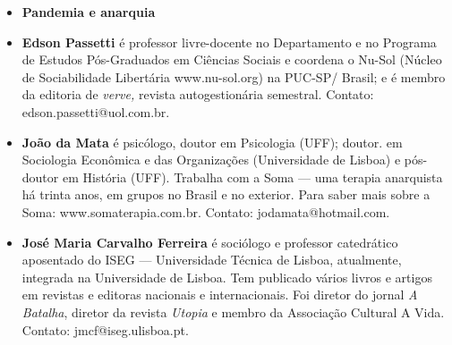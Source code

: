 \begin{itemize}
\item \textbf{Pandemia e anarquia} \lipsum[1]


\item \textbf{Edson Passetti} é professor livre-docente no Departamento e no
Programa de Estudos Pós-Graduados em Ciências Sociais e coordena o
Nu-Sol (Núcleo de Sociabilidade Libertária
www.nu-sol.org) na PUC-SP/ Brasil; e é membro da editoria de \emph{verve,} revista autogestionária semestral. Contato: edson.passetti@uol.com.br.

\item \textbf{João da Mata} é psicólogo, doutor em Psicologia (UFF); doutor.
em Sociologia Econômica e das Organizações (Universidade de Lisboa) e
pós-doutor em História (UFF). Trabalha com a Soma --- uma terapia
anarquista há trinta anos, em grupos no Brasil e no exterior. Para saber
mais sobre a Soma:
www.somaterapia.com.br. Contato:
jodamata@hotmail.com.

\item \textbf{José Maria Carvalho Ferreira} é sociólogo e professor
catedrático aposentado do ISEG --- Universidade Técnica de Lisboa,
atualmente, integrada na Universidade de Lisboa. Tem publicado vários
livros e artigos em revistas e editoras nacionais e internacionais. Foi
diretor do jornal \emph{A Batalha}, diretor da revista \emph{Utopia} e
membro da Associação Cultural A Vida. Contato:
jmcf@iseg.ulisboa.pt.

\end{itemize}


